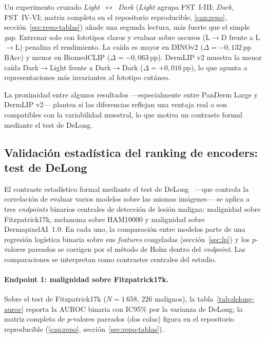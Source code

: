 Un experimento cruzado \emph{Light}~$\leftrightarrow$~\emph{Dark}
(\emph{Light} agrupa FST~I-III; \emph{Dark}, FST~IV-VI; matriz completa
en el repositorio reproducible, \ref{cap:repo}, sección~\ref{sec:repo-tablas}) añade una
segunda lectura, más fuerte que el simple \emph{gap}.
Entrenar solo con fototipos claros y evaluar sobre oscuros (L$\to$D
frente a L$\to$L) penaliza el rendimiento. La caída es mayor en
DINOv2 ($\Delta = -0{,}132$\,pp BAcc) y menor en BiomedCLIP
($\Delta = -0{,}063$\,pp). DermLIP v2 muestra la menor caída
Dark$\to$Light frente a Dark$\to$Dark ($\Delta = +0{,}016$\,pp), lo
que apunta a representaciones más invariantes al fototipo cutáneo.

La proximidad entre algunos resultados ---especialmente entre PanDerm
Large y DermLIP v2--- plantea si las diferencias reflejan una ventaja
real o son compatibles con la variabilidad muestral, lo que motiva un
contraste formal mediante el test de DeLong.

\subsection{Validación estadística del ranking de encoders: test de
DeLong}
\label{sec:equidad-delong}

El contraste estadístico formal mediante el test de
DeLong~\cite{delong1988} ---que controla la correlación de evaluar
varios modelos sobre las mismas imágenes--- se aplica a tres
\emph{endpoints} binarios centrales de detección de lesión maligna:
malignidad sobre Fitzpatrick17k, melanoma sobre HAM10000 y malignidad
sobre DermapixelAI~1.0. En cada uno, la comparación entre modelos parte
de una regresión logística binaria sobre sus \emph{features} congeladas
(sección~\ref{sec:lp}) y los $p$-valores pareados se corrigen por el
método de Holm dentro del \emph{endpoint}. Las comparaciones se
interpretan como contrastes centrales del estudio.

\paragraph{Endpoint 1: malignidad sobre Fitzpatrick17k.}
Sobre el test de Fitzpatrick17k ($N = 1\,658$, $226$ malignos), la
tabla~\ref{tab:delong-auroc} reporta la AUROC binaria con IC95\% por la
varianza de DeLong; la matriz completa de $p$-valores pareados (dos
colas) figura en el repositorio reproducible (\ref{cap:repo},
sección~\ref{sec:repo-tablas}).

